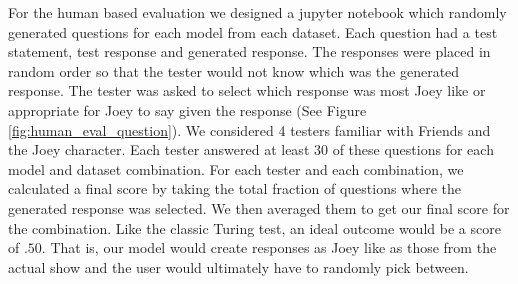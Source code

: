 For the human based evaluation we designed a jupyter notebook which randomly generated questions for each model from each dataset.
Each question had a test statement, test response and generated response.
The responses were placed in random order so that the tester would not know which was the generated response.
The tester was asked to select which response was most Joey like or appropriate for Joey to say given the response (See Figure \ref{fig:human_eval_question}).
We considered 4 testers familiar with Friends and the Joey character. 
Each tester answered at least 30 of these questions for each model and dataset combination.
For each tester and each combination, we calculated a final score by taking the total fraction of questions where the generated response was selected.
We then averaged them to get our final score for the combination.
Like the classic Turing test, an ideal outcome would be a score of $.50$.
That is, our model would create responses as Joey like as those from the actual show and the user would ultimately have to randomly pick between.


